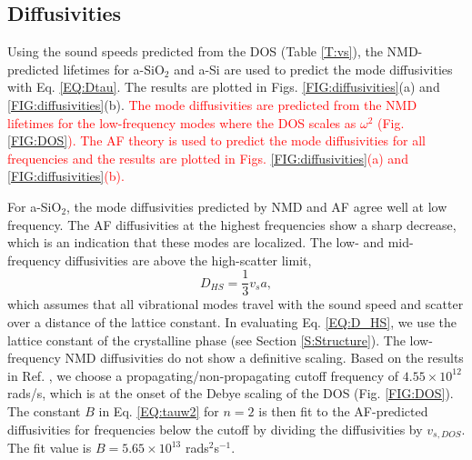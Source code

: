 \documentclass[aps,prb,onecolumn,preprint,superscriptaddress,footinbib,amsmath,amssymb,floatfix]{revtex4}
\begin{document}
\vspace{10mm}

\subsection{\label{S:Diffusivities}Diffusivities}

Using the sound speeds predicted 
from the DOS (Table \ref{T:vs}), the NMD-predicted lifetimes 
for a-SiO$_2$ and a-Si are used to predict the mode diffusivities with 
Eq. \eqref{EQ:Dtau}. The results are plotted in 
Figs. \ref{FIG:diffusivities}(a) and \ref{FIG:diffusivities}(b).  
\textcolor{red}{
The mode diffusivities are predicted from the NMD lifetimes for the 
low-frequency modes where the DOS scales as $\omega^2$ 
(Fig. \ref{FIG:DOS}). 
The AF theory is used to predict the mode 
diffusivities for all frequencies and the results are plotted in 
Figs. \ref{FIG:diffusivities}(a) and \ref{FIG:diffusivities}(b). 
}

For a-SiO$_2$, the mode diffusivities predicted by NMD and AF agree 
well at low frequency. The AF diffusivities at 
the highest frequencies show a sharp decrease, which is an indication 
that these modes are localized.\cite{feldman_thermal_1993} 
The low- and mid-frequency diffusivities are above the 
high-scatter limit, 
\begin{equation}\label{EQ:D_HS}
D_{HS} = \frac{1}{3} v_s a,
\end{equation}
which assumes that all vibrational modes travel with the sound speed  
and scatter over a distance of the lattice constant.
\cite{cahill_lattice_1988} In evaluating Eq. \eqref{EQ:D_HS}, 
we use the lattice constant of the 
crystalline phase (see Section \ref{S:Structure}). The low-frequency 
NMD diffusivities do not show a 
definitive scaling. Based on the results in 
Ref. , we choose a 
propagating/non-propagating cutoff frequency of 
$4.55\times10^{12}$ rads/s, which is at the onset 
of the Debye scaling of the DOS (Fig. \ref{FIG:DOS}). 
The constant $B$ in Eq. \eqref{EQ:tauw2} for $n=2$ 
is then fit to the AF-predicted diffusivities for 
frequencies below the cutoff by dividing the diffusivities 
by $v_{s,DOS}$. The fit value is $B=5.65\times10^{13}$ 
rads$^2$s$^{-1}$.
\end{document}
